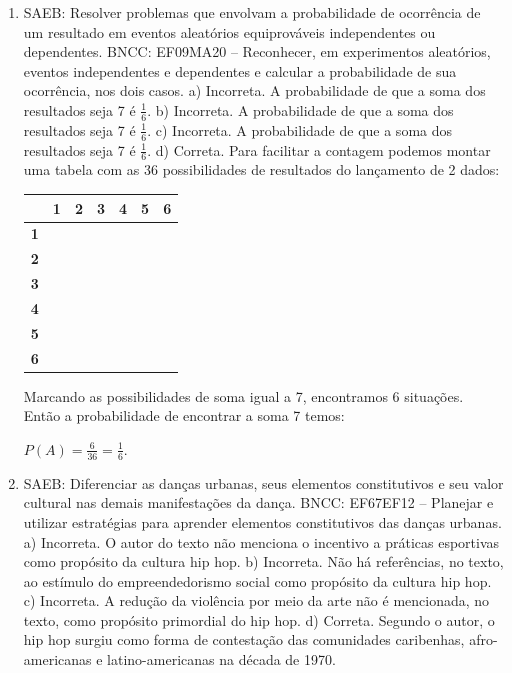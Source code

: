 \begin{enumerate}
\item
SAEB: Resolver problemas que envolvam a probabilidade de
ocorrência de um resultado em eventos aleatórios equiprováveis
independentes ou dependentes.
BNCC: EF09MA20 -- Reconhecer, em experimentos aleatórios, eventos
independentes e dependentes e calcular a probabilidade de sua
ocorrência, nos dois casos.
a) Incorreta. A probabilidade de que a soma dos resultados seja 
7 é $\frac{1}{6}$.
b) Incorreta. A probabilidade de que a soma dos resultados seja 
7 é $\frac{1}{6}$.
c) Incorreta. A probabilidade de que a soma dos resultados seja 
7 é $\frac{1}{6}$.
d) Correta. Para facilitar a contagem podemos montar uma tabela com as 36
possibilidades de resultados do lançamento de 2 dados:

\begin{longtable}[]{@{}lllllll@{}}
\toprule
\textbf{~} & \textbf{1} & \textbf{2} & \textbf{3} & \textbf{4} &
\textbf{5} & \textbf{6}\tabularnewline
\midrule
\endhead
\textbf{1} & \textbf{~} & \textbf{~} & \textbf{~} & \textbf{~} &
\textbf{~} & \textbf{~}\tabularnewline
\textbf{2} & \textbf{~} & \textbf{~} & \textbf{~} & \textbf{~} &
\textbf{~} & \textbf{~}\tabularnewline
\textbf{3} & \textbf{~} & \textbf{~} & \textbf{~} & \textbf{~} &
\textbf{~} & \textbf{~}\tabularnewline
\textbf{4} & \textbf{~} & \textbf{~} & \textbf{~} & \textbf{~} &
\textbf{~} & \textbf{~}\tabularnewline
\textbf{5} & \textbf{~} & \textbf{~} & \textbf{~} & \textbf{~} &
\textbf{~} & \textbf{~}\tabularnewline
\textbf{6} & \textbf{~} & \textbf{~} & \textbf{~} & \textbf{~} &
\textbf{~} & \textbf{~}\tabularnewline
\bottomrule
\end{longtable}

Marcando as possibilidades de soma igual a 7, encontramos 6 situações.
Então a probabilidade de encontrar a soma 7 temos:

$P(A) = \frac{6}{36} = \frac{1}{6}$.

\item
SAEB: Diferenciar as danças urbanas, seus elementos constitutivos
e seu valor cultural nas demais manifestações da dança.
BNCC: EF67EF12 -- Planejar e utilizar estratégias para aprender
elementos constitutivos das danças urbanas.
a) Incorreta. O autor do texto não menciona o incentivo a práticas
esportivas como propósito da cultura hip hop. 
b) Incorreta. Não há referências, no texto, ao estímulo do empreendedorismo
social como propósito da cultura hip hop. 
c) Incorreta. A redução da violência por meio da arte não é mencionada, no 
texto, como propósito primordial do hip hop. 
d) Correta. Segundo o autor, o hip hop surgiu como forma de contestação 
das comunidades caribenhas, afro-americanas e latino-americanas na
década de 1970.


\end{enumerate}
